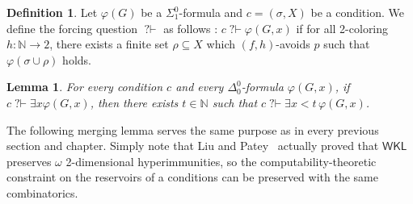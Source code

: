 \documentclass{article}
\def\PP{\mathbb{P}}
\newcommand{\qvdash}{\operatorname{{?}{\vdash}}}
\newcommand{\nqvdash}{\operatorname{{?}{\nvdash}}}
\newcommand{\WKL}[0]{\mathsf{WKL}}
\newcommand{\NN}[0]{\mathbb{N}}
\def\qt#1{``#1''}%
\def\N{\mathbb{N}}
\def\NN{\mathbb{N}}
\def\PP{\mathbb{P}}
\def\PP{\mathbb{P}}
\def\qt#1{``#1''}%
\numberwithin{theorem}{section}
\newtheorem{lemma}[theorem]{Lemma}
\theoremstyle{definition}
\newtheorem{definition}[theorem]{Definition}
\begin{document}

\begin{definition}
    Let $\varphi(G)$ be a $\Sigma^0_1$-formula and $c = (\sigma, X)$ be a condition. We define the forcing question $\qvdash$ as follows :
    $c \qvdash \varphi(G,x)$ if for all 2-coloring $h : \N \to 2$, there exists a finite set $\rho \subseteq X$ which $(f,h)$-avoids $p$ such that $\varphi(\sigma \cup \rho)$ holds.
\end{definition}


\begin{lemma}
    For every condition $c$ and every $\Delta^0_0$-formula $\varphi(G,x)$, if $c \qvdash \exists x \varphi(G,x)$, then there exists $t \in \NN$ such that $c \qvdash \exists x<t \,\varphi(G,x) $.
\end{lemma}

The following merging lemma serves the same purpose as in every previous section and chapter.
Simply note that Liu and Patey~\cite[Corollary 2.7]{liu2022reverse} actually proved that $\WKL$ preserves $\omega$ 2-dimensional hyperimmunities, so the computability-theoretic constraint on the reservoirs of a conditions can be preserved with the same combinatorics.

\end{document}
